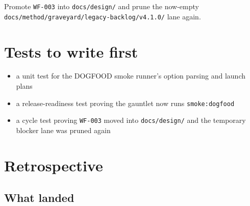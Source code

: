 \begin{enumerate}
  Promote \texttt{W\allowbreak{}F\allowbreak{}-\allowbreak{}0\allowbreak{}0\allowbreak{}3} into \texttt{d\allowbreak{}o\allowbreak{}c\allowbreak{}s\allowbreak{}/\allowbreak{}d\allowbreak{}e\allowbreak{}s\allowbreak{}i\allowbreak{}g\allowbreak{}n\allowbreak{}/} and prune the now-empty \texttt{d\allowbreak{}o\allowbreak{}c\allowbreak{}s\allowbreak{}/\allowbreak{}m\allowbreak{}e\allowbreak{}t\allowbreak{}h\allowbreak{}o\allowbreak{}d\allowbreak{}/\allowbreak{}g\allowbreak{}r\allowbreak{}a\allowbreak{}v\allowbreak{}e\allowbreak{}y\allowbreak{}a\allowbreak{}r\allowbreak{}d\allowbreak{}/\allowbreak{}l\allowbreak{}e\allowbreak{}g\allowbreak{}a\allowbreak{}c\allowbreak{}y\allowbreak{}-\allowbreak{}b\allowbreak{}a\allowbreak{}c\allowbreak{}k\allowbreak{}l\allowbreak{}o\allowbreak{}g\allowbreak{}/\allowbreak{}v\allowbreak{}4\allowbreak{}.\allowbreak{}1\allowbreak{}.\allowbreak{}0\allowbreak{}/} lane again.
\end{enumerate}

\section{Tests to write first}\label{record-201-tests-to-write-first}

\begin{itemize}
\tightlist
\item
  a unit test for the DOGFOOD smoke runner's option parsing and launch plans
\item
  a release-readiness test proving the gauntlet now runs \texttt{s\allowbreak{}m\allowbreak{}o\allowbreak{}k\allowbreak{}e\allowbreak{}:\allowbreak{}d\allowbreak{}o\allowbreak{}g\allowbreak{}f\allowbreak{}o\allowbreak{}o\allowbreak{}d}
\item
  a cycle test proving \texttt{W\allowbreak{}F\allowbreak{}-\allowbreak{}0\allowbreak{}0\allowbreak{}3} moved into \texttt{d\allowbreak{}o\allowbreak{}c\allowbreak{}s\allowbreak{}/\allowbreak{}d\allowbreak{}e\allowbreak{}s\allowbreak{}i\allowbreak{}g\allowbreak{}n\allowbreak{}/} and the temporary blocker lane was pruned again
\end{itemize}

\section{Retrospective}\label{record-201-retrospective}

\subsection{What landed}\label{record-201-what-landed}

